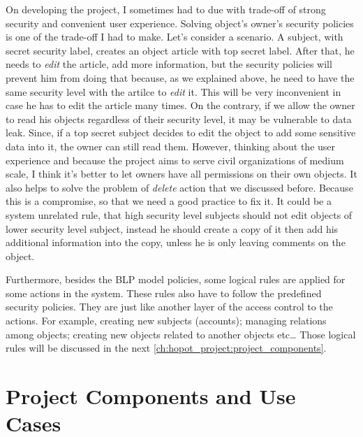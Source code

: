 On developing the project, I sometimes had to due with trade-off of strong security and convenient user experience.
Solving object's owner's security policies is one of the trade-off I had to make.
Let's consider a scenario.
A subject, with secret security label, creates an object \eg article with top secret label. 
After that, he needs to \emph{edit} the article, \eg add more information, but the security policies will prevent him from doing that because, as we explained above, he need to have the same security level with the artilce to \emph{edit} it.
This will be very inconvenient in case he has to edit the article many times.
On the contrary, if we allow the owner to read his objects regardless of their security level, it may be vulnerable to data leak.
Since, if a top secret subject decides to edit the object to add some sensitive data into it, the owner can still read them.
However, thinking about the user experience and because the project aims to serve civil organizations of medium scale, I think it's better to let owners have all permissions on their own objects.
It also helps to solve the problem of \emph{delete} action that we discussed before.
Because this is a compromise, so that we need a good practice to fix it.
It could be a system unrelated rule, that high security level subjects should not edit objects of lower security level subject, instead he should create a copy of it then add his additional information into the copy, unless he is only leaving comments on the object.

Furthermore, besides the BLP model policies, some logical rules are applied for some actions in the system.
These rules also have to follow the predefined security policies.
They are just like another layer of the access control to the actions.
For example, creating new subjects (accounts); managing relations among objects; creating new objects related to another objects etc\dots
Those logical rules will be discussed in the next \autoref{ch:hopot_project:project_components}.

\section{Project Components and Use Cases}
\label{ch:hopot_project:project_components}

